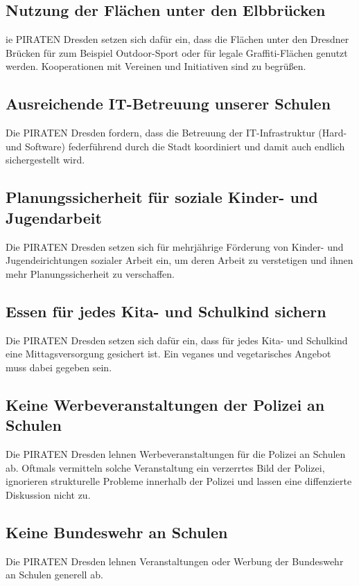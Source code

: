 \documentclass[a4paper, 11pt]{article}
\begin{document}
\subsection{Nutzung der Flächen unter den Elbbrücken }
ie PIRATEN Dresden setzen sich dafür ein, dass die Flächen unter den Dresdner Brücken für zum Beispiel Outdoor-Sport oder für legale Graffiti-Flächen genutzt werden. Kooperationen mit Vereinen und Initiativen sind zu begrüßen.


\subsection{Ausreichende IT-Betreuung unserer Schulen}
Die PIRATEN Dresden fordern, dass die Betreuung der IT-Infrastruktur (Hard- und Software) federführend durch die Stadt koordiniert und damit auch endlich sichergestellt wird.


\subsection{Planungssicherheit für soziale Kinder- und Jugendarbeit}
Die PIRATEN Dresden setzen sich für mehrjährige Förderung von Kinder- und Jugendeirichtungen sozialer Arbeit ein, um deren Arbeit zu verstetigen und ihnen mehr Planungssicherheit zu verschaffen.


\subsection{Essen für jedes Kita- und Schulkind sichern}
Die PIRATEN Dresden setzen sich dafür ein, dass für jedes Kita- und Schulkind eine Mittagsversorgung gesichert ist. Ein veganes und vegetarisches Angebot muss dabei gegeben sein.



\subsection{Keine Werbeveranstaltungen der Polizei an Schulen}
Die PIRATEN Dresden lehnen Werbeveranstaltungen für die Polizei an Schulen ab. Oftmals vermitteln solche Veranstaltung ein verzerrtes Bild der Polizei, ignorieren strukturelle Probleme innerhalb der Polizei und lassen eine diffenzierte Diskussion nicht zu.


\subsection{Keine Bundeswehr an Schulen}
Die PIRATEN Dresden lehnen Veranstaltungen oder Werbung der Bundeswehr an Schulen generell ab.
\end{document}
